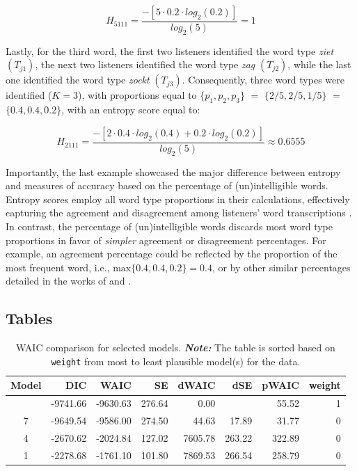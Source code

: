 \documentclass[
  authoryear,
  preprint,
  1p]{elsarticle}
\begin{document}
\[ 
H_{5111} = \frac{ -\left[ 5 \cdot 0.2 \cdot log_{2}(0.2) \right] }{ log_{2}(5)} = 1
\]

Lastly, for the third word, the first two listeners identified the word
type \emph{ziet} \((T_{j1})\), the next two listeners identified the
word type \emph{zag} \((T_{j2})\), while the last one identified the
word type \emph{zoekt} \((T_{j3})\). Consequently, three word types were
identified (\(K=3\)), with proportions equal to
\(\{ p_{1}, p_{2}, p_{3} \}\) \(=\) \(\{ 2/5, 2/5, 1/5 \}\) \(=\)
\(\{ 0.4, 0.4, 0.2 \}\), with an entropy score equal to:

\[
H_{2111} = \frac{ -\left[ 2 \cdot 0.4 \cdot log_{2}(0.4) + 0.2 \cdot log_{2}(0.2) \right] }{ log_{2}(5)} \approx 0.6555
\]

Importantly, the last example showcased the major difference between
entropy and measures of accuracy based on the percentage of
(un)intelligible words. Entropy scores employ all word type proportions
in their calculations, effectively capturing the agreement and
disagreement among listeners' word transcriptions
\citep{Boonen_et_al_2023}. In contrast, the percentage of
(un)intelligible words discards most word type proportions in favor of
\emph{simpler} agreement or disagreement percentages. For example, an
agreement percentage could be reflected by the proportion of the most
frequent word, i.e., \(\text{max}\{ 0.4, 0.4, 0.2 \}=0.4\), or by other
similar percentages detailed in the works of \citet{Flipsen_2006} and
\citet{Lagerberg_et_al_2014}.

\newpage{}

\subsection{Tables}\label{sec-appB}

\begin{longtable}[]{@{}crrrrrrr@{}}

\caption{\label{tbl-rq1-waic}WAIC comparison for selected models.
\textbf{\emph{Note:}} The table is sorted based on \texttt{weight} from
most to least plausible model(s) for the data.}

\tabularnewline

\toprule\noalign{}
Model & DIC & WAIC & SE & dWAIC & dSE & pWAIC & weight \\
\midrule\noalign{}
\endhead
\bottomrule\noalign{}
\endlastfoot
10 & -9741.66 & -9630.63 & 276.64 & 0.00 & & 55.52 & 1 \\
7 & -9649.54 & -9586.00 & 274.50 & 44.63 & 17.89 & 31.77 & 0 \\
4 & -2670.62 & -2024.84 & 127.02 & 7605.78 & 263.22 & 322.89 & 0 \\
1 & -2278.68 & -1761.10 & 101.80 & 7869.53 & 266.54 & 258.79 & 0 \\

\end{longtable}
\end{document}
